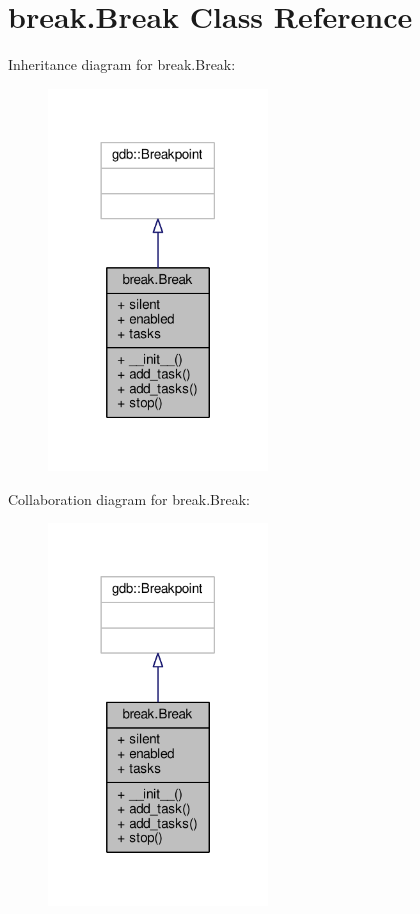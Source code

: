 \hypertarget{classbreak_1_1Break}{}\section{break.\+Break Class Reference}
\label{classbreak_1_1Break}


Inheritance diagram for break.\+Break\+:\nopagebreak
\begin{figure}[H]
\begin{center}
\leavevmode
\includegraphics[width=165pt]{classbreak_1_1Break__inherit__graph}
\end{center}
\end{figure}


Collaboration diagram for break.\+Break\+:\nopagebreak
\begin{figure}[H]
\begin{center}
\leavevmode
\includegraphics[width=165pt]{classbreak_1_1Break__coll__graph}
\end{center}
\end{figure}
